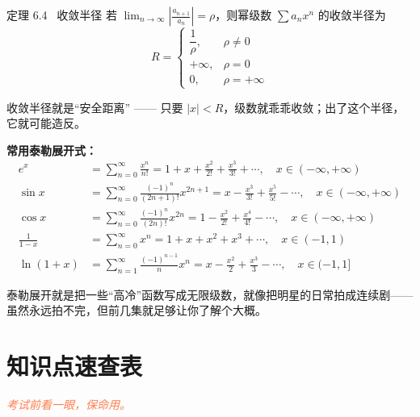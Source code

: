 \documentclass[12pt,a4paper]{article}
\newcommand{\humor}[1]{\par\smallskip\begin{humorbox}#1\end{humorbox}\smallskip}
\begin{document}
\begin{thmbox}{定理 6.4 \ 收敛半径}
若 $\displaystyle\lim_{n\to\infty}\left|\frac{a_{n+1}}{a_n}\right| = \rho$，则幂级数 $\sum a_n x^n$ 的收敛半径为
\[
R = \begin{cases} \dfrac{1}{\rho}, & \rho \neq 0 \\[6pt] +\infty, & \rho = 0 \\[4pt] 0, & \rho = +\infty \end{cases}
\]
\end{thmbox}
\humor{收敛半径就是“安全距离” —— 只要 $|x|<R$，级数就乖乖收敛；出了这个半径，它就可能造反。}

\begin{formulaframe}
\centering
\textbf{常用泰勒展开式：}
\[
\begin{aligned}
e^x &= \sum_{n=0}^{\infty} \frac{x^n}{n!} = 1 + x + \frac{x^2}{2!} + \frac{x^3}{3!} + \cdots, \quad x \in (-\infty, +\infty) \\[8pt]
\sin x &= \sum_{n=0}^{\infty} \frac{(-1)^n}{(2n+1)!} x^{2n+1} = x - \frac{x^3}{3!} + \frac{x^5}{5!} - \cdots, \quad x \in (-\infty, +\infty) \\[8pt]
\cos x &= \sum_{n=0}^{\infty} \frac{(-1)^n}{(2n)!} x^{2n} = 1 - \frac{x^2}{2!} + \frac{x^4}{4!} - \cdots, \quad x \in (-\infty, +\infty) \\[8pt]
\frac{1}{1-x} &= \sum_{n=0}^{\infty} x^n = 1 + x + x^2 + x^3 + \cdots, \quad x \in (-1, 1) \\[8pt]
\ln(1+x) &= \sum_{n=1}^{\infty} \frac{(-1)^{n-1}}{n} x^n = x - \frac{x^2}{2} + \frac{x^3}{3} - \cdots, \quad x \in (-1, 1]
\end{aligned}
\]
\end{formulaframe}
\humor{泰勒展开就是把一些“高冷”函数写成无限级数，就像把明星的日常拍成连续剧——虽然永远拍不完，但前几集就足够让你了解个大概。}

\newpage
\section{知识点速查表}
\vspace{-0.5em}
\begin{center}\textcolor{Coral}{\itshape 考试前看一眼，保命用。}\end{center}
\end{document}
